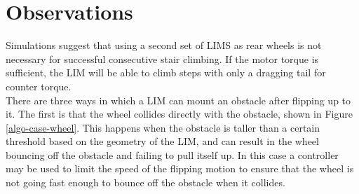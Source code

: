 
\section{Observations}

Simulations suggest that using a second set of LIMS as rear wheels is not necessary for successful consecutive stair climbing. If the motor torque is sufficient, the LIM will be able to climb steps with only a dragging tail for counter torque.\\

There are three ways in which a LIM can mount an obstacle after flipping up to it. The first is that the wheel collides directly with the obstacle, shown in Figure \ref{algo-case-wheel}. This happens when the obstacle is taller than a certain threshold based on the geometry of the LIM, and can result in the wheel bouncing off the obstacle and failing to pull itself up. In this case a controller may be used to limit the speed of the flipping motion to ensure that the wheel is not going fast enough to bounce off the obstacle when it collides. \\
%


